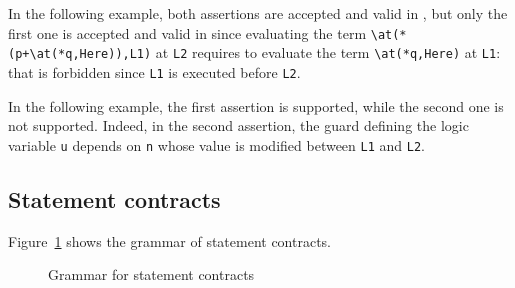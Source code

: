 \begin{example}
  In the following example, both assertions are accepted and valid in \acsl, but
  only the first one is accepted and valid in \eacsl since evaluating the term
  \verb|\at(*(p+\at(*q,Here)),L1)| at \verb|L2| requires to evaluate the term
  \verb|\at(*q,Here)| at \verb|L1|: that is forbidden since \verb|L1| is
  executed before \verb|L2|.  
\end{example}

\begin{example}
  In the following example, the first assertion is supported, while the second
  one is not supported. Indeed, in the second assertion, the guard defining the
  logic variable \verb|u| depends on \verb|n| whose value is modified between
  \verb|L1| and \verb|L2|.
\end{example}



\subsection{Statement contracts}
\label{sec:statement_contract}

\nodiff

Figure~\ref{fig:gram:stcontracts} shows the grammar of statement contracts.

\begin{figure}[htbp]
  \begin{cadre}
    
  \end{cadre}
  \caption{Grammar for statement contracts}
  \label{fig:gram:stcontracts}
\end{figure}

